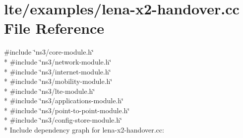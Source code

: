 \hypertarget{lena-x2-handover_8cc}{}\section{lte/examples/lena-\/x2-\/handover.cc File Reference}
\label{lena-x2-handover_8cc}
{\ttfamily \#include \char`\"{}ns3/core-\/module.\+h\char`\"{}}\\*
{\ttfamily \#include \char`\"{}ns3/network-\/module.\+h\char`\"{}}\\*
{\ttfamily \#include \char`\"{}ns3/internet-\/module.\+h\char`\"{}}\\*
{\ttfamily \#include \char`\"{}ns3/mobility-\/module.\+h\char`\"{}}\\*
{\ttfamily \#include \char`\"{}ns3/lte-\/module.\+h\char`\"{}}\\*
{\ttfamily \#include \char`\"{}ns3/applications-\/module.\+h\char`\"{}}\\*
{\ttfamily \#include \char`\"{}ns3/point-\/to-\/point-\/module.\+h\char`\"{}}\\*
{\ttfamily \#include \char`\"{}ns3/config-\/store-\/module.\+h\char`\"{}}\\*
Include dependency graph for lena-\/x2-\/handover.cc\+:
